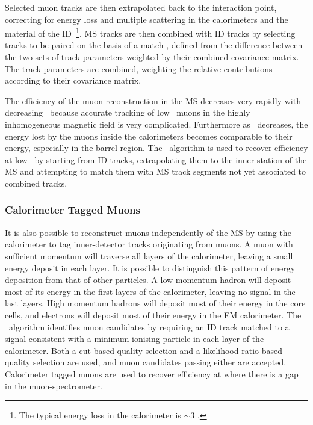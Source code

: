 Selected muon tracks are then extrapolated back to the interaction point,
correcting for energy loss and multiple scattering in the calorimeters and the
material of the ID~\footnote{The typical energy loss in the calorimeter is $\sim
3$ \GeV.}. MS tracks are then combined with ID tracks by selecting tracks to be
paired on the basis of a match \chisquared, defined from the difference between
the two sets of track parameters weighted by their combined covariance matrix.
The track parameters are combined, weighting the relative contributions
according to their covariance matrix.

The efficiency of the muon reconstruction in the MS decreases very rapidly with
decreasing \pt\ because accurate tracking of low \pt\ muons in the highly
inhomogeneous magnetic field is very complicated.
Furthermore as \pt\ decreases, the energy lost by the muons inside the
calorimeters becomes comparable to their energy, especially in the barrel
region. The \mutag\ algorithm is used to recover efficiency at low \pt\ by
starting from ID tracks, extrapolating them to the inner station of the MS and
attempting to match them with MS track segments not yet associated to combined
tracks.

\subsubsection{Calorimeter Tagged Muons}

It is also possible to reconstruct muons independently of the MS by using the
calorimeter to tag inner-detector tracks originating from muons.  A muon with
sufficient momentum will traverse all layers of the calorimeter, leaving a small
energy deposit in each layer. It is possible to distinguish this pattern of
energy deposition from that of other particles. A low momentum hadron will
deposit most of its energy in the first layers of the calorimeter, leaving no
signal in the last layers. High momentum hadrons will deposit most of their
energy in the core cells, and electrons will deposit most of their energy in the
EM calorimeter. The \CaloTrkMuID\ algorithm identifies muon candidates by
requiring an ID track matched to a signal consistent with a
minimum-ionising-particle in each layer of the calorimeter. 
Both a cut based quality selection and a likelihood ratio based quality
selection are used, and muon candidates passing either are accepted. Calorimeter
tagged muons are used to recover efficiency at  where there is a
gap in the muon-spectrometer.

